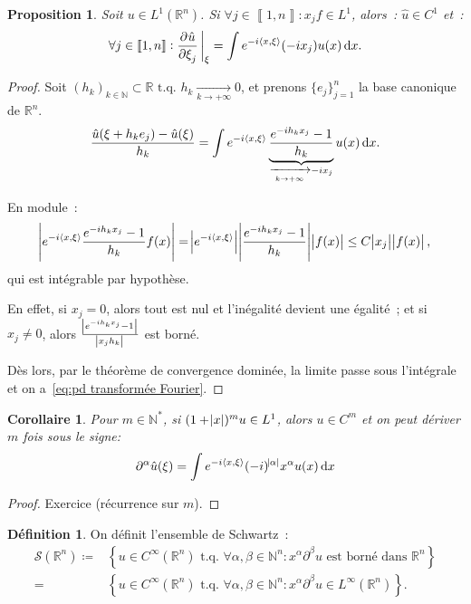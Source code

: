 \documentclass{report}
\newcommand{\R}{{\mathbb R}}
\newcommand{\N}{{\mathbb N}}
\newcommand{\scpr}[2]{\left\langle#1, #2\right\rangle}
\newcommand{\tq}{\text{ t.q. }}
\newcommand{\pinfty}{{+\infty}}
\newcommand{\intint}[2]{{\left\llbracket#1, #2\right\rrbracket}}
\newtheorem{prp}[thm]{Proposition}
\newtheorem{cor}[thm]{Corollaire}
\theoremstyle{definition}
\newtheorem{déf}[thm]{Définition}
\theoremstyle{remark}
\begin{document}
\begin{prp} Soit $u \in L^1(\R^n)$. Si $\forall j \in \intint 1n : x_jf \in L^1$, alors~: $\hat u \in C^1$ et~:
\begin{equation}\label{eq:pd transformée Fourier}
	\forall j \in \intint 1n : \dpd {\hat u}{\xi_j}\sVert[3]_\xi = \int e^{-i\scpr x\xi}(-ix_j)u(x)\dif x.
\end{equation}
\end{prp}

\begin{proof} Soit $(h_k)_{k \in \N} \subset \R \tq h_k \xrightarrow[k \to \pinfty]{} 0$, et prenons $\{e_j\}_{j=1}^n$ la base canonique de $\R^n$.
\[\frac {\hat u(\xi + h_ke_j) - \hat u(\xi)}{h_k} = \int e^{-i\scpr x\xi}\underbrace {\frac {e^{-ih_kx_j}-1}{h_k}}_{\xrightarrow[k \to \pinfty]{} -ix_j}u(x)\dif x.\]

En module~:
\[\abs {e^{-i\scpr x\xi}\frac {e^{-ih_kx_j}-1}{h_k}f(x)} = \abs {e^{-i\scpr x\xi}}\abs {\frac {e^{-ih_kx_j}-1}{h_k}}\abs {f(x)} \leq C\abs {x_j}\abs {f(x)},\]
qui est intégrable par hypothèse.

En effet, si $x_j = 0$, alors tout est nul et l'inégalité devient une égalité~; et si $x_j \neq 0$, alors $\frac {\abs {e^{-ih_kx_j}-1}}{\abs {x_jh_k}}$ est borné.

Dès lors, par le théorème de convergence dominée, la limite passe sous l'intégrale et on a~\eqref{eq:pd transformée Fourier}.
\end{proof}

\begin{cor} Pour $m \in \N^*$, si $(1+\abs x)^mu \in L^1$, alors $u \in C^m$ et on peut dériver $m$ fois sous le signe:
\[\partial^\alpha\hat u(\xi) = \int e^{-i\scpr x\xi}(-i)^{\abs \alpha}x^\alpha u(x)\dif x\]
\end{cor}

\begin{proof} Exercice (récurrence sur $m$).
\end{proof}

\begin{déf} On définit l'ensemble de Schwartz~:
\begin{equation}\begin{aligned}
	\mathcal S(\R^n) \coloneqq &\left\{u \in C^\infty(\R^n) \tq \forall \alpha, \beta \in \N^n : x^\alpha\partial^\beta u \text{ est borné dans } \R^n\right\} \\
		= &\left\{u \in C^\infty(\R^n) \tq \forall \alpha, \beta \in \N^n : x^\alpha\partial^\beta u \in L^\infty(\R^n)\right\}.
\end{aligned}\end{equation}
\end{déf}
\end{document}
